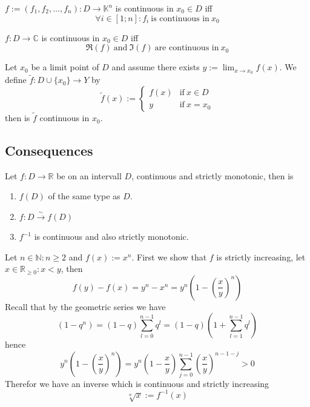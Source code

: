 \begin{theorem}
   \(f := (f_1, f_2, \ldots, f_n): D \to \mathbb{K}^n\) is continuous in \(x_0 \in D\) iff
   \[\forall i \in [1; n]: f_i~\text{is continuous in}~x_0\]
\end{theorem}

\begin{theorem}
   \(f: D \to \mathbb{C}\) is continuous in \(x_0 \in D\) iff
   \[\Re(f)~\text{and}~\Im(f)~\text{are continuous in}~x_0\]
\end{theorem}

\begin{proposition}
   Let \(x_0\) be a limit point of \(D\) and assume there exists \(y := \lim_{x \to x_0} f(x)\).
   We define \(\tilde{f}: D \cup \{x_0\} \to Y\) by
   \[\tilde{f}(x) := \begin{cases}f(x) & \text{if}~x \in D\\ y & \text{if}~x = x_0\end{cases}\]
   then is \(\tilde{f}\) continuous in \(x_0\).
\end{proposition}

\subsection{Consequences}
\begin{theorem}
   Let \(f: D \to \mathbb{R}\) be on an intervall \(D\), continuous and strictly monotonic, then is
   \begin{enumerate}[label=\roman*, align=Center]
      \item \(f(D)\) of the same type as \(D\).
      \item \(f:D \xrightarrow{\sim} f(D)\)
      \item \(f^{-1}\) is continuous and also strictly monotonic.
   \end{enumerate}
\end{theorem}
\begin{example}
   Let \(n \in \mathbb{N}: n \geq 2\) and \(f(x) := x^n\).
   First we show that \(f\) is strictly increasing, let \(x \in \mathbb{R}_{\geq 0}: x < y\), then
   \[f(y) - f(x) = y^n - x^n = y^n \left(1 - \left(\frac{x}{y}\right)^n\right)\]
   Recall that by the geometric series we have
   \[(1- q^n) = (1-q) \sum_{l=0}^{n-1} q^l = (1-q)\left(1 + \sum_{l=1}^{n-1} q^l\right)\]
   hence
   \[y^n \left(1 - \left(\frac{x}{y}\right)^n\right) = y^n \left(1 - \frac{x}{y}\right) \sum_{j=0}^{n-1} \left(\frac{x}{y}\right)^{n-1-j} > 0\]
   Therefor we have an inverse which is continuous and strictly increasing
   \[\sqrt[n]{x} := f^{-1}(x)\]
\end{example}

